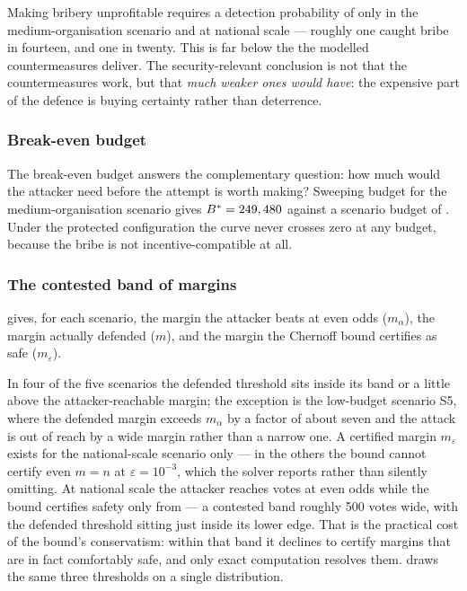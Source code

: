 \begin{finding}
Making bribery unprofitable requires a detection probability of only
\STwoQCritical{} in the medium-organisation scenario and
\SThreeQCritical{} at national scale --- roughly one caught bribe in
fourteen, and one in twenty. This is far below the \ProtectedQ{} the
modelled countermeasures deliver. The security-relevant conclusion is
not that the countermeasures work, but that \emph{much weaker ones
would have}: the expensive part of the defence is buying certainty
rather than deterrence.
\end{finding}

\subsubsection{Break-even budget}

The break-even budget answers the complementary question: how much
would the attacker need before the attempt is worth making?
Sweeping budget for the medium-organisation scenario gives
$B^{*} = 249,480$ against a scenario budget of \STwoBudget. Under the protected configuration the
curve never crosses zero at any budget, because the bribe is not
incentive-compatible at all.

\subsubsection{The contested band of margins}

 gives, for each scenario, the margin the
attacker beats at even odds ($m_\alpha$), the margin actually defended
($m$), and the margin the Chernoff bound certifies as safe
($m_\varepsilon$).

In four of the five scenarios the defended threshold sits inside its
band or a little above the attacker-reachable margin; the exception is
the low-budget scenario S5, where the defended margin exceeds
$m_\alpha$ by a factor of about seven and the attack is out of reach by
a wide margin rather than a narrow one. A certified margin
$m_\varepsilon$ exists for the national-scale scenario only --- in the
others the bound cannot certify even $m = n$ at
$\varepsilon = 10^{-3}$, which the solver reports rather than
silently omitting. At national scale the attacker reaches
\SThreeMReachable{} votes at even odds while the bound certifies safety
only from \SThreeMCertified{} --- a contested band roughly 500 votes
wide, with the defended threshold \SThreeM{} sitting just inside its
lower edge. That is the practical cost of the
bound's conservatism: within that band it declines to certify margins
that are in fact comfortably safe, and only exact computation resolves
them.  draws the same three thresholds on a single
distribution.

